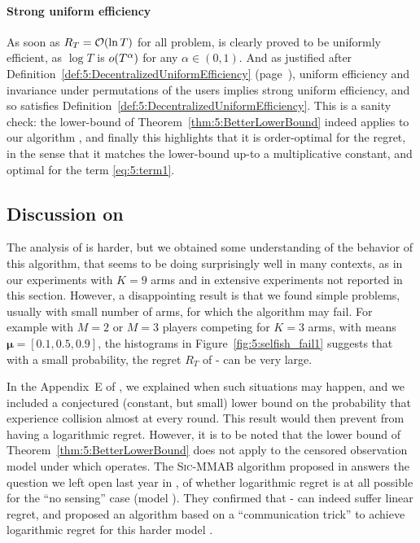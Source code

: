 \paragraph{Strong uniform efficiency}\label{app:5:JustifyingDefinition5}
%
As soon as $R_T = \mathop{}\mathopen{}\mathcal{O}\mathopen{}\left(\ln T\right)$ for all problem, \MCTopM{} is clearly proved
to be uniformly efficient, as $\log T$ is $\mathop{}\mathopen{}o\mathopen{}\left(T^{\alpha}\right)$ for any $\alpha\in(0,1)$.
%
And as justified after Definition~\ref{def:5:DecentralizedUniformEfficiency} (page~\pageref{def:5:DecentralizedUniformEfficiency}), uniform efficiency and invariance under permutations of the users implies strong uniform efficiency, and so \MCTopM{} satisfies Definition~\ref{def:5:DecentralizedUniformEfficiency}.
%
This is a sanity check: the lower-bound of
Theorem~\ref{thm:5:BetterLowerBound} indeed applies to our algorithm \MCTopM,
and finally this highlights that it is order-optimal for the regret, in the sense that it matches the lower-bound up-to a multiplicative constant,
and optimal for the term \ref{eq:5:term1}.


\subsection{Discussion on \Selfish} \label{sub:5:SelfishFails}

The analysis of \Selfish{} is harder, but we obtained some understanding of the behavior of this algorithm, that seems to be doing surprisingly well in many contexts, as in our experiments with $K=9$ arms and in extensive experiments not reported in this section. However, a disappointing result is that we found simple problems, usually with small number of arms, for which the algorithm may fail. For example with $M=2$ or $M=3$ players competing for $K=3$ arms,
with means $\boldsymbol{\mu} = [0.1, 0.5, 0.9]$, the histograms in Figure~\ref{fig:5:selfish_fail1} suggests that with a small probability, the regret $R_T$ of \Selfish-\klUCB{} can be very large.

In the Appendix~E of \cite{Besson2018ALT},
we explained when such situations may happen, and we included a conjectured (constant, but small) lower bound on the probability that \Selfish{} experience collision almost at every round. This result would then prevent \Selfish{} from having a logarithmic regret. However, it is to be noted that the lower bound of Theorem~\ref{thm:5:BetterLowerBound} does not apply to the censored observation model \modeltrois{} under which \Selfish{} operates.
%
The \textsc{Sic-MMAB} algorithm proposed in \cite{BoursierPerchet18} answers the question we left open last year in \cite{Besson2018ALT},
of whether logarithmic regret is at all possible for the ``no sensing'' case (model \modeltrois).
They confirmed that \Selfish-\UCB{} can indeed suffer linear regret, and proposed an algorithm based on a ``communication trick'' to achieve logarithmic regret for this harder model \modeltrois.




